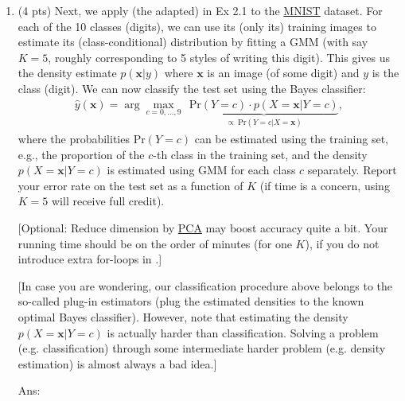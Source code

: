 \documentclass[10pt,letter,notitlepage]{article}
\newcommand{\xv}{\mathbf{x}}
\newcommand{\red}[1]{{\color{red}#1}}
\newcommand{\magenta}[1]{{\color{magenta}#1}}
\newcommand{\eg}{{e.g.}\xspace}
\newcommand{\ans}[1]{{\color{orange}\textsf{Ans}: #1}}
\newcounter{exercise}
\begin{document}
\begin{exercise}
\begin{enumerate}
		\item (4 pts) Next, we apply (the adapted)  in Ex 2.1 to the \href{https://pytorch.org/vision/0.9/datasets.html#mnist}{\magenta{MNIST}} dataset. For each of the 10 classes (digits), we can use its (only its) training images to estimate its (class-conditional) distribution by fitting a GMM (with say $K=5$, roughly corresponding to 5 styles of writing this digit). This gives us the density estimate $p(\xv | y)$ where $\xv$ is an image (of some digit) and $y$ is the class (digit). We can now classify the test set using the Bayes classifier:
		\begin{align}
		\hat y(\xv) = \arg\max_{c = 0, \ldots, 9} ~~ \underbrace{\mathrm{Pr}(Y = c) \cdot p(X = \xv | Y = c)}_{\propto ~\mathrm{Pr}(Y=c | X=\xv)},
		\end{align}
		where the probabilities $\mathrm{Pr}(Y = c)$ can be estimated using the training set, \eg, the proportion of the $c$-th class in the training set, and the \red{density} $p(X = \xv | Y = c)$ is estimated using GMM for each class $c$ separately. Report your error rate on the test set as a function of $K$ (if time is a concern, using $K=5$ will receive  full credit). 
		
		[Optional: Reduce dimension by \href{https://en.wikipedia.org/wiki/Principal_component_analysis}{\magenta{PCA}} may boost accuracy quite a bit. Your running time should be on the order of minutes (for one $K$), if you do not introduce extra for-loops in .]
		
		[In case you are wondering, our classification procedure above belongs to the so-called plug-in estimators (plug the estimated densities to the known optimal Bayes classifier). However, note that estimating the density $p(X=\xv | Y = c)$ is actually harder than classification. Solving a problem (\eg classification) through some intermediate harder problem (\eg density estimation) is almost always a bad idea.]
		
		\ans{}
		

	\end{enumerate}	
\end{exercise}
\end{document}
